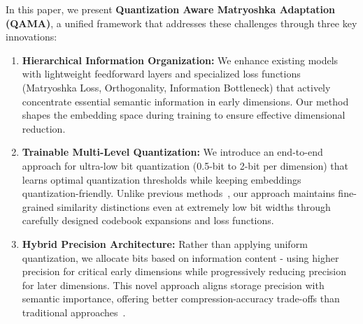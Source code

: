 In this paper, we present \textbf{Quantization Aware Matryoshka Adaptation (QAMA)}, a unified framework that addresses these challenges through three key innovations:

\begin{enumerate}
    \item \textbf{Hierarchical Information Organization:} We enhance existing models with lightweight feedforward layers and specialized loss functions (Matryoshka Loss, Orthogonality, Information Bottleneck) that actively concentrate essential semantic information in early dimensions. 
    Our method shapes the embedding space during training to ensure effective dimensional reduction.
    
    \item \textbf{Trainable Multi-Level Quantization:} We introduce an end-to-end approach for ultra-low bit quantization (0.5-bit to 2-bit per dimension) that learns optimal quantization thresholds while keeping embeddings quantization-friendly. 
    Unlike previous methods~\cite{shen2018nash, shu2018compressing}, our approach maintains fine-grained similarity distinctions even at extremely low bit widths through carefully designed codebook expansions and loss functions.
    
    \item \textbf{Hybrid Precision Architecture:} Rather than applying uniform quantization, we allocate bits based on information content - using higher precision for critical early dimensions while progressively reducing precision for later dimensions. 
    This novel approach aligns storage precision with semantic importance, offering better compression-accuracy trade-offs than traditional approaches~\cite{jaderberg2014speeding, sainath2013low}.
    
\end{enumerate}


